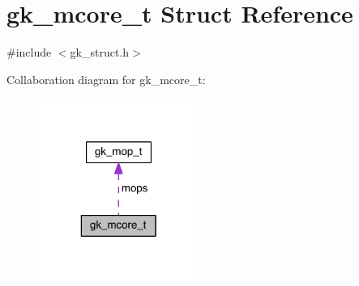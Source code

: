 \hypertarget{a00682}{}\section{gk\+\_\+mcore\+\_\+t Struct Reference}
\label{a00682}


{\ttfamily \#include $<$gk\+\_\+struct.\+h$>$}



Collaboration diagram for gk\+\_\+mcore\+\_\+t\+:\nopagebreak
\begin{figure}[H]
\begin{center}
\leavevmode
\includegraphics[width=148pt]{a00680}
\end{center}
\end{figure}
